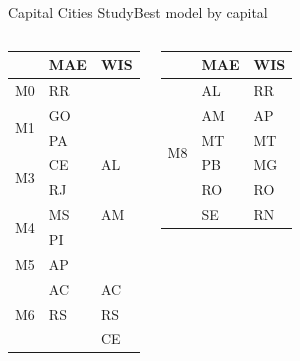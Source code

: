\documentclass[xcolor=dvipsnames,t,aspectratio=169]{beamer} %
\newcommand{\highlight}[1]{{\color{fgv_light_blue} #1}}
\begin{document}
\begin{frame}[c]{Capital Cities Study}{Best model by capital}
\begin{columns}[T]
    \begin{display}
        \begin{table}[H]
            \centering
            \begin{tabular}{l|ll}
                 & MAE & WIS \\
                \hline
                M0 & RR & \\
                \hline
                \multirow{2}{*}{M1} & GO & \\
                 & PA & \\
                 \hline
                \multirow{2}{*}{M3} & CE & AL \\
                 & RJ & \\
                 \hline
                \multirow{2}{*}{M4} & MS & AM \\
                 & PI & \\
                 \hline
                M5 & AP & \\
                \hline
                \multirow{3}{*}{M6} 
                 & \highlight{AC} & \highlight{AC} \\
                 & \highlight{RS} & \highlight{RS} \\
                 & & CE \\
            \end{tabular}
        \end{table}
    \end{display}

    \begin{display}[AR winners]
        \begin{table}[H]
            \centering
            \begin{tabular}{l|ll}
                 & MAE & WIS \\
                \hline
                \multirow{6}{*}{M8} 
                 & AL & RR \\
                 & AM & AP \\
                 & \highlight{MT} & \highlight{MT} \\
                 & PB & MG \\
                 & \highlight{RO} & \highlight{RO} \\
                 & SE & RN \\
                 \hline
            \end{tabular}
        \end{table}
    \end{display}
\end{columns}

\end{frame}
\end{document}
